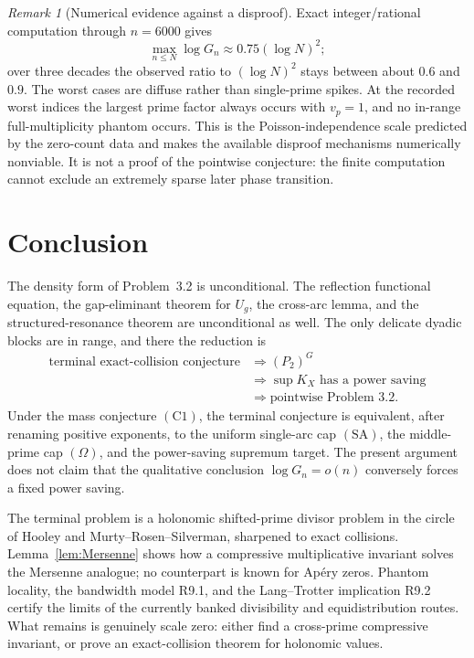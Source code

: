 \documentclass[11pt]{amsart}
\theoremstyle{plain}
\theoremstyle{remark}
\newtheorem{remark}{Remark}
\begin{document}
\begin{remark}[Numerical evidence against a disproof]
Exact integer/rational computation through $n=6000$ gives
\[
 \max_{n\leq N}\log G_n\approx0.75(\log N)^2;
\]
over three decades the observed ratio to $(\log N)^2$ stays between
about $0.6$ and $0.9$.  The worst cases are diffuse rather than
single-prime spikes.  At the recorded worst indices the largest prime
factor always occurs with $v_p=1$, and no in-range full-multiplicity
phantom occurs.  This is the Poisson-independence scale predicted by
the zero-count data and makes the available disproof mechanisms
numerically nonviable.  It is not a proof of the pointwise conjecture:
the finite computation cannot exclude an extremely sparse later
phase transition.
\end{remark}

\section{Conclusion}

The density form of Problem~3.2 is unconditional.  The reflection
functional equation, the gap-eliminant theorem for $U_g$, the cross-arc
lemma, and the structured-resonance theorem are unconditional as well.
The only delicate dyadic blocks are in range, and there the reduction is
\[
 \begin{aligned}
 \text{terminal exact-collision conjecture}
 &\Longrightarrow (P_2)^G\\
 &\Longrightarrow \sup K_X\text{ has a power saving}\\
 &\Longrightarrow \text{pointwise Problem~3.2}.
 \end{aligned}
\]
Under the mass conjecture $(\mathrm C1)$, the terminal conjecture is
equivalent, after renaming positive exponents, to the uniform
single-arc cap $(\mathrm{SA})$, the middle-prime cap $(\Omega)$, and the
power-saving supremum target.  The present argument does not claim that
the qualitative conclusion $\log G_n=o(n)$ conversely forces a fixed
power saving.

The terminal problem is a holonomic shifted-prime divisor problem in
the circle of Hooley and Murty--Rosen--Silverman, sharpened to exact
collisions.  Lemma~\ref{lem:Mersenne} shows how a compressive
multiplicative invariant solves the Mersenne analogue; no counterpart
is known for Ap\'ery zeros.  Phantom locality, the bandwidth model
R9.1, and the Lang--Trotter implication R9.2 certify the limits of the
currently banked divisibility and equidistribution routes.  What
remains is genuinely scale zero: either find a cross-prime compressive
invariant, or prove an exact-collision theorem for holonomic values.
\end{document}

